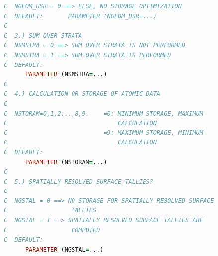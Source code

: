 \begin{lstlisting}[language={Fortran}]
C  NGEOM_USR = 0 ==> ELSE, NO STORAGE OPTIMIZATION
C  DEFAULT:       PARAMETER (NGEOM_USR=...)
C
C  3.) SUM OVER STRATA
C  NSMSTRA = 0 ==> SUM OVER STRATA IS NOT PERFORMED
C  NSMSTRA = 1 ==> SUM OVER STRATA IS PERFORMED
C  DEFAULT:
      PARAMETER (NSMSTRA=...)
C
C  4.) CALCULATION OR STORAGE OF ATOMIC DATA
C
C  NSTORAM=0,1,2...,8,9.    =0: MINIMUM STORAGE, MAXIMUM
C                               CALCULATION
C                           =9: MAXIMUM STORAGE, MINIMUM
C                               CALCULATION
C  DEFAULT:
      PARAMETER (NSTORAM=...)
C
C  5.) SPATIALLY RESOLVED SURFACE TALLIES?
C
C  NGSTAL = 0 ==> NO STORAGE FOR SPATIALLY RESOLVED SURFACE 
C                  TALLIES
C  NGSTAL = 1 ==> SPATIALLY RESOLVED SURFACE TALLIES ARE 
C                  COMPUTED
C  DEFAULT:
      PARAMETER (NGSTAL=...)
\end{lstlisting} 

